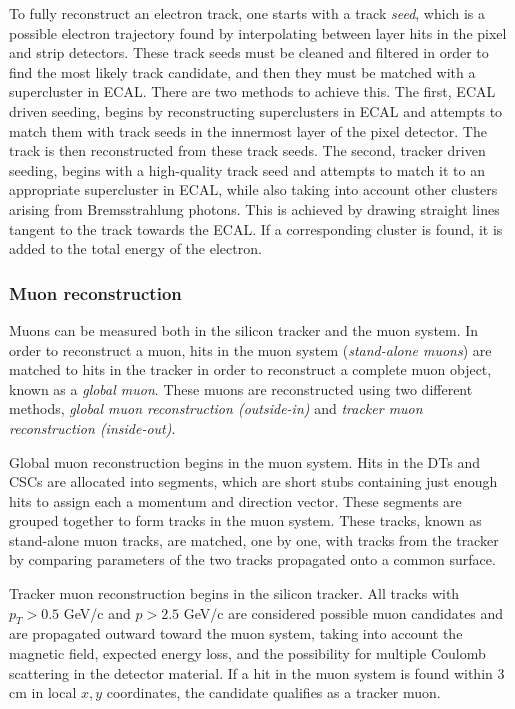 To fully reconstruct an electron track, one starts with a track \emph{seed}, which is a possible electron trajectory found by interpolating between layer hits in the pixel and strip detectors. These track seeds must be cleaned and filtered in order to find the most likely track candidate, and then they must be matched with a supercluster in ECAL. There are two methods to achieve this. The first, ECAL driven seeding, begins by reconstructing superclusters in ECAL and attempts to match them with track seeds in the innermost layer of the pixel detector. The track is then reconstructed from these track seeds. The second, tracker driven seeding, begins with a high-quality track seed and attempts to match it to an appropriate supercluster in ECAL, while also taking into account other clusters arising from Bremsstrahlung photons. This is achieved by drawing straight lines tangent to the track towards the ECAL. If a corresponding cluster is found, it is added to the total energy of the electron.

\subsubsection{Muon reconstruction}

Muons can be measured both in the silicon tracker and the muon system. In order to reconstruct a muon, hits in the muon system (\emph{stand-alone muons}) are matched to hits in the tracker in order to reconstruct a complete muon object, known as a \emph{global muon}. These muons are reconstructed using two different methods, \emph{global muon reconstruction (outside-in)} and \emph{tracker muon reconstruction (inside-out)}.

Global muon reconstruction begins in the muon system. Hits in the DTs and CSCs are allocated into segments, which are short stubs containing just enough hits to assign each a momentum and direction vector. These segments are grouped together to form tracks in the muon system. These tracks, known as stand-alone muon tracks, are matched, one by one, with tracks from the tracker by comparing parameters of the two tracks propagated onto a common surface.

Tracker muon reconstruction begins in the silicon tracker. All tracks with $p_{T} > 0.5$ GeV/c and $p > 2.5$ GeV/c are considered possible muon candidates and are propagated outward toward the muon system, taking into account the magnetic field, expected energy loss, and the possibility for multiple Coulomb scattering in the detector material. If a hit in the muon system is found within 3 cm in local $x, y$ coordinates, the candidate qualifies as a tracker muon.

